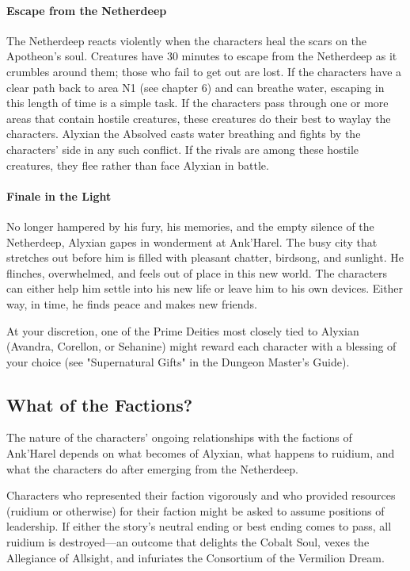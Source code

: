 \documentclass[10pt,a4paper,twoside,twocolumn,openany,nodeprecatedcode]{dndbook}
\begin{document}
\paragraph{Escape from the Netherdeep}
The Netherdeep reacts violently when the characters heal the scars on the Apotheon's soul. Creatures have 30 minutes to escape from the Netherdeep as it crumbles around them; those who fail to get out are lost. If the characters have a clear path back to area N1 (see chapter 6) and can breathe water, escaping in this length of time is a simple task. If the characters pass through one or more areas that contain hostile creatures, these creatures do their best to waylay the characters. Alyxian the Absolved casts water breathing and fights by the characters' side in any such conflict. If the rivals are among these hostile creatures, they flee rather than face Alyxian in battle.

\paragraph{Finale in the Light}
No longer hampered by his fury, his memories, and the empty silence of the Netherdeep, Alyxian gapes in wonderment at Ank'Harel. The busy city that stretches out before him is filled with pleasant chatter, birdsong, and sunlight. He flinches, overwhelmed, and feels out of place in this new world. The characters can either help him settle into his new life or leave him to his own devices. Either way, in time, he finds peace and makes new friends.

At your discretion, one of the Prime Deities most closely tied to Alyxian (Avandra, Corellon, or Sehanine) might reward each character with a blessing of your choice (see "Supernatural Gifts" in the Dungeon Master's Guide).

\subsection{What of the Factions?}
The nature of the characters' ongoing relationships with the factions of Ank'Harel depends on what becomes of Alyxian, what happens to ruidium, and what the characters do after emerging from the Netherdeep.

Characters who represented their faction vigorously and who provided resources (ruidium or otherwise) for their faction might be asked to assume positions of leadership. If either the story's neutral ending or best ending comes to pass, all ruidium is destroyed—an outcome that delights the Cobalt Soul, vexes the Allegiance of Allsight, and infuriates the Consortium of the Vermilion Dream.
\end{document}

